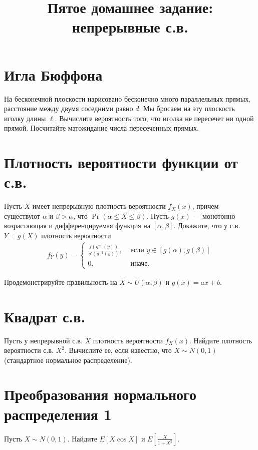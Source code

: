 \documentclass[12pt]{article}
\title{Пятое домашнее задание: непрерывные с.в.}
\begin{document}
\maketitle

\section{Игла Бюффона}

На бесконечной плоскости нарисовано бесконечно много параллельных прямых, расстояние между двумя соседними равно $d$. Мы бросаем на эту плоскость иголку длины $\ell$. Вычислите вероятность того, что иголка не пересечет ни одной прямой. Посчитайте матожидание числа пересеченных прямых.

\section{Плотность вероятности функции от с.в.}

Пусть $X$ имеет непрерывную плотность вероятности $f_X(x)$, причем существуют $\alpha$ и $\beta > \alpha$, что $\Pr(\alpha \le X \le \beta)$. Пусть $g(x)$ --- монотонно возрастающая и дифференцируемая функция на $[\alpha, \beta]$. Докажите, что у с.в. $Y = g(X)$ плотность вероятности
\begin{align*}
    f_Y(y) = \begin{cases}
        \frac{f(g^{-1}(y))}{g'(g^{-1}(y))}, &\text{ если } y \in [g(\alpha), g(\beta)] \\
        0, &\text{ иначе.}
    \end{cases}
\end{align*}

Продемонстрируйте правильность на $X \sim U(\alpha, \beta)$ и $g(x) = ax + b$. 

\section{Квадрат с.в.}

Пусть у непрерывной с.в. $X$ плотность вероятности $f_X(x)$. Найдите плотность вероятности с.в. $X^2$. Вычислите ее, если известно, что $X \sim N(0, 1)$ (стандартное нормальное распределение).

\section{Преобразования нормального распределения 1}

Пусть $X \sim N(0, 1)$. Найдите $E[X\cos X]$ и $E[\frac{X}{1 + X^2}]$.
\end{document}
